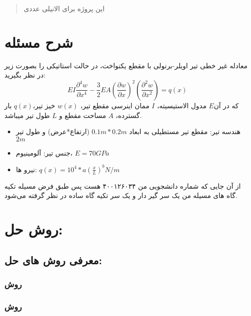 \documentclass[12pt]{article}
\begin{document}
\fontsize{12pt}{14pt}\selectfont



\begin{abstract}
\noindent
این پروژه برای الانیلی عددی
\end{abstract}

\section{شرح مسئله}

معادله غیر خطی تیر اویلر-برنولی با مقطع یکنواخت، در حالت استاتیکی را بصورت زیر در نظر بگیرید:
\begin{equation}
	E I \frac{\partial^4 w}{\partial x^4}-\frac{3}{2} E A\left(\frac{\partial w}{\partial x}\right)^2\left(\frac{\partial^2 w}{\partial x^2}\right)=q(x)
\end{equation}
که در آن$E$ مدول الاستیسیته، $I$ ممان اینرسی مقطع تیر، $w(x)$ خیز تیر،$q(x)$ بار گسترده، $A$ مساحت مقطع و $L$ طول تیر میباشد.
\\
\begin{itemize}
  \item هندسه تیر: مقطع تیر مستطیلی به ابعاد $0.1m * 0.2m$ (ارتفاع*عرض) و طول تیر $2m$ 
  \item جنس تیر: آلومینیوم، $E = 70GPa$
  \item نیرو ها: $q(x)=10^4 * a\left(\frac{x}{L}\right)^b N / m$
\end{itemize}
از آن جایی که شماره دانشجویی من ۴۰۰۱۲۶۰۳۴  هست پس طبق فرض مسيله تکیه گاه های مسيله من یک سر گیر دار و یک سر تکیه گاه ساده در نظر گرفته می‌شود.
\section{ روش حل:}
\subsection{معرفی روش های حل:}
	\subsubsection{روش }
	\subsubsection{روش }
\end{document}
